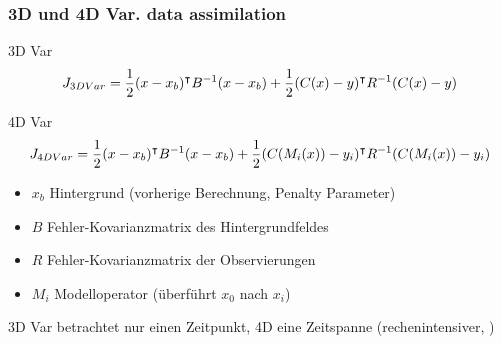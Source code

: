 \appendix
{}
\setcounter{finalframe}{\value{framenumber}}

\begin{frame}
\frametitle{3D und 4D Var. data assimilation}

\begin{block}{3D Var}
 \[J_{3DVar} = \frac{1}{2}(x-x_b)^\intercal B^{-1} (x-x_b) +  \frac{1}{2} (C(x) -y)^\intercal R^{-1}(C(x) -y)\]
\end{block}
\begin{block}{4D Var}
\[J_{4DVar} = \frac{1}{2}(x-x_b)^\intercal B^{-1} (x-x_b) + \frac{1}{2} (C(M_i(x)) -y_i)^\intercal R^{-1}(C(M_i(x)) -y_i)\]
\end{block}
\begin{itemize}
\item $x_b$ Hintergrund (vorherige Berechnung, Penalty Parameter)
 \item $B$ Fehler-Kovarianzmatrix des Hintergrundfeldes
 \item $R$ Fehler-Kovarianzmatrix der Observierungen
 \item $M_i$ Modelloperator (überführt $x_0$ nach $x_i$)
\end{itemize}
3D Var betrachtet nur einen Zeitpunkt, 4D eine Zeitspanne (rechenintensiver, \cite{huang2003introduction})
\end{frame}

